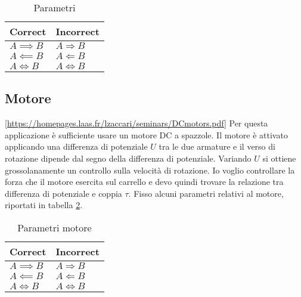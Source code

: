 \begin{table}[htbp]
    \centering
    \begin{tabular}{@{}ll@{}}
        \toprule
        \textbf{Correct}     & \textbf{Incorrect}         \\
        \midrule
        \( A \implies B \)   & \( A \Rightarrow B \)      \\
        \( A \impliedby B \) & \( A \Leftarrow B \)       \\
        \( A \iff B \)       & \( A \Leftrightarrow B \)  \\
        \bottomrule
    \end{tabular}
    \caption[Parametri]{Parametri}
    \label{tab:parametri}
\end{table}

\subsection{Motore}
\ref{https://homepages.laas.fr/lzaccari/seminars/DCmotors.pdf}
Per questa applicazione è sufficiente usare un motore DC a spazzole. Il motore è attivato applicando una differenza di potenziale $U$ tra le due armature e il verso di rotazione dipende dal segno della differenza di potenziale. Variando $U$ si ottiene grossolanamente un controllo sulla velocità di rotazione. Io voglio controllare la forza che il motore esercita sul carrello e devo quindi trovare la relazione tra differenza di potenziale e coppia $\tau$.
Fisso alcuni parametri relativi al motore, riportati in tabella \ref{tab:parametri-motore}.

\begin{table}[htbp]
    \centering
    \begin{tabular}{@{}ll@{}}
        \toprule
        \textbf{Correct}     & \textbf{Incorrect}         \\
        \midrule
        \( A \implies B \)   & \( A \Rightarrow B \)      \\
        \( A \impliedby B \) & \( A \Leftarrow B \)       \\
        \( A \iff B \)       & \( A \Leftrightarrow B \)  \\
        \bottomrule
    \end{tabular}
    \caption[Parametri motore]{Parametri motore}
    \label{tab:parametri-motore}
\end{table}


